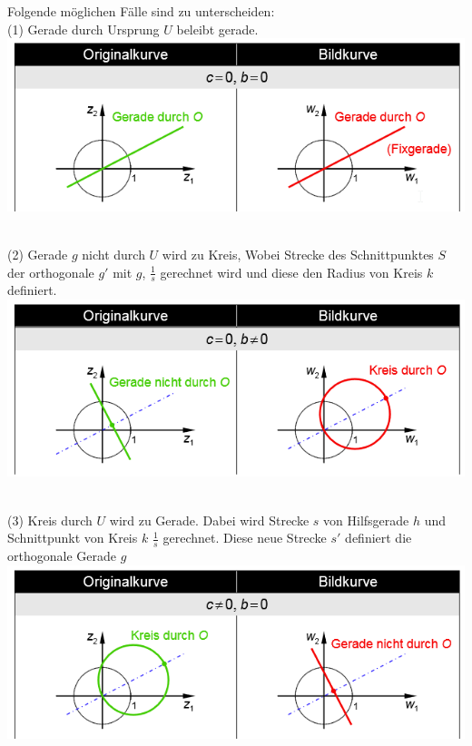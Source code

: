 Folgende möglichen Fälle sind zu unterscheiden:\\
\noindent (1) Gerade durch Ursprung $U$ beleibt gerade.\\
\includegraphics[width=\columnwidth]{Images/kreisspiegelung_gerade_o}

~\\
\noindent (2) Gerade $g$ nicht durch $U$ wird zu Kreis, Wobei Strecke des Schnittpunktes $S$ der orthogonale $g'$ mit $g$, $\frac{1}{s}$ gerechnet wird und diese den Radius von Kreis $k$ definiert.\\
\includegraphics[width=\columnwidth]{Images/kreisspiegelung_gerade_no}

~\\
\noindent (3) Kreis durch $U$ wird zu Gerade. Dabei wird Strecke $s$ von Hilfsgerade $h$ und Schnittpunkt von Kreis $k$ $\frac{1}{s}$ gerechnet. Diese neue Strecke $s'$ definiert die orthogonale Gerade $g$\\
\includegraphics[width=\columnwidth]{Images/kreisspiegelung_kreis_o}

